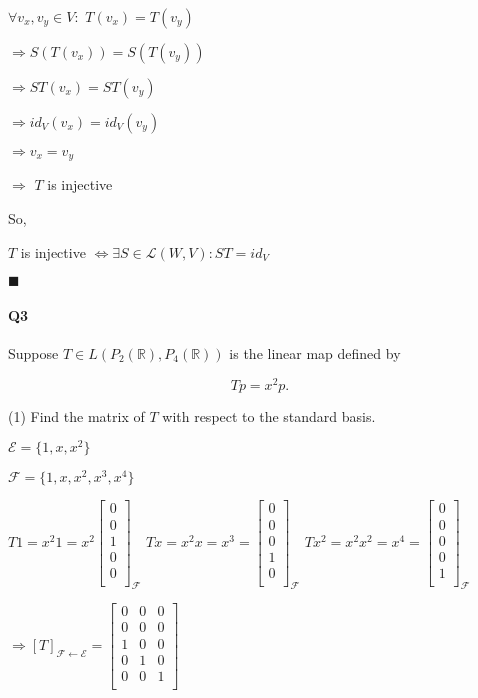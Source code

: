 \documentclass{article}
\begin{document}
$\forall v_x,v_y \in V :$ $T(v_x) = T(v_y)$

$\Rightarrow S(T(v_x)) = S(T(v_y))$

$\Rightarrow ST(v_x) = ST(v_y)$

$\Rightarrow id_V(v_x) = id_V(v_y)$

$\Rightarrow v_x = v_y$

$\Rightarrow$ $T$ is injective

So,

$T$ is injective $\Leftrightarrow \exists S \in \mathcal{L}(W,V):
ST = id_V$

\vspace{0.618 em}
$\blacksquare$


\newpage

\paragraph{Q3} Suppose $T \in L(P_2(\mathbb{R}), P_4(\mathbb{R}))$ is
the linear map defined by

\[T p = x^2 p.\]

(1) Find the matrix of $T$ with respect to the standard basis.

$\mathcal{E} = \{1, x, x^2\}$

$\mathcal{F} = \{1, x, x^2, x^3, x^4\}$

$T 1 = x^2 1 = x^2 \begin{bmatrix} 0\\ 0 \\ 1 \\ 0 \\ 0\\\end{bmatrix}_{\mathcal{F}}$
$T x = x^2 x = x^3 =\begin{bmatrix} 0\\ 0 \\ 0 \\ 1 \\
  0\\\end{bmatrix}_{\mathcal{F}}$
$T x^2 = x^2 x^2 = x^4 = \begin{bmatrix} 0\\ 0 \\ 0 \\ 0 \\
  1\\\end{bmatrix}_{\mathcal{F}}$

$\Rightarrow [T]_{\mathcal{F} \leftarrow \mathcal{E}} =
\begin{bmatrix} 0& 0 &0 \\ 0&0&0 \\ 1&0&0 \\ 0&1&0 \\ 0&0&1\\\end{bmatrix}$
\end{document}
